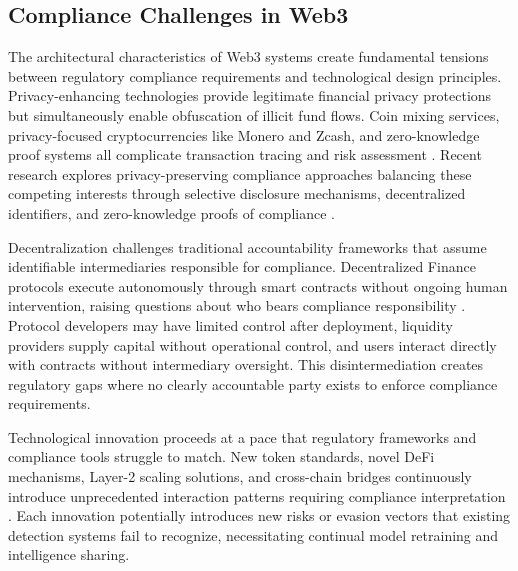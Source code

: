 \subsection{Compliance Challenges in Web3}

The architectural characteristics of Web3 systems create fundamental tensions between regulatory compliance requirements and technological design principles. Privacy-enhancing technologies provide legitimate financial privacy protections but simultaneously enable obfuscation of illicit fund flows. Coin mixing services, privacy-focused cryptocurrencies like Monero and Zcash, and zero-knowledge proof systems all complicate transaction tracing and risk assessment \cite{moser2018empiricalanalysistraceability,kappos2018empiricalanalysisanonymity}. Recent research explores privacy-preserving compliance approaches balancing these competing interests through selective disclosure mechanisms, decentralized identifiers, and zero-knowledge proofs of compliance \cite{yang2024researchidentitydata,ben-sasson2017scalablezeroknowledge,zhang2024blockchainzeroknowledge}.

Decentralization challenges traditional accountability frameworks that assume identifiable intermediaries responsible for compliance. Decentralized Finance protocols execute autonomously through smart contracts without ongoing human intervention, raising questions about who bears compliance responsibility \cite{harvey2021defifuturefinance,werbach2018trustverifywhy}. Protocol developers may have limited control after deployment, liquidity providers supply capital without operational control, and users interact directly with contracts without intermediary oversight. This disintermediation creates regulatory gaps where no clearly accountable party exists to enforce compliance requirements.

Technological innovation proceeds at a pace that regulatory frameworks and compliance tools struggle to match. New token standards, novel DeFi mechanisms, Layer-2 scaling solutions, and cross-chain bridges continuously introduce unprecedented interaction patterns requiring compliance interpretation \cite{mohammedabdul2024navigatingblockchainstwin,xu2024exploringblockchaintechnology}. Each innovation potentially introduces new risks or evasion vectors that existing detection systems fail to recognize, necessitating continual model retraining and intelligence sharing.
